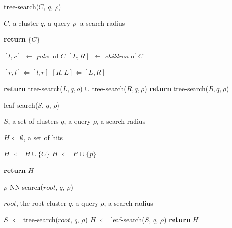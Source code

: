 \begin{algorithm} 
    \caption{tree-search($C$, $q$, $\rho$)} 
    \label{alg:methods:rnn-search:tree-search} 
    \begin{algorithmic}
        \REQUIRE $C$, a cluster
        \REQUIRE $q$, a query
        \REQUIRE $\rho$, a search radius

            \STATE \textbf{return} $\{C\}$
        \ELSE

            \STATE $[l, r]$ $\Leftarrow$ \emph{pole}s of $C$
            \STATE $[L, R]$ $\Leftarrow$ \emph{children} of $C$

                \STATE $[r, l] \Leftarrow [l, r]$
                \STATE $[R, L] \Leftarrow [L, R]$
            \ENDIF

                \STATE \textbf{return} tree-search($L, q, \rho$) $\cup$ tree-search($R, q, \rho$)
            \ELSE
                \STATE \textbf{return} tree-search($R, q, \rho$)
            \ENDIF
        \ENDIF
    \end{algorithmic}
\end{algorithm}

\begin{algorithm} 
    \caption{leaf-search($S$, $q$, $\rho$)} 
    \label{alg:methods:rnn-search:leaf-search} 
    \begin{algorithmic}
        \REQUIRE $S$, a set of clusters
        \REQUIRE $q$, a query
        \REQUIRE $\rho$, a search radius

        \STATE $H \Leftarrow \emptyset$, a set of hits

                \STATE $H$ $\Leftarrow$ $H \cup \{C\}$
            \ELSE
                        \STATE $H$ $\Leftarrow$ $H \cup \{p\}$
                    \ENDIF
                \ENDFOR
            \ENDIF
        \ENDFOR

        \STATE \textbf{return} $H$
    \end{algorithmic}
\end{algorithm}

\begin{algorithm} 
    \caption{$\rho$-NN-search($root$, $q$, $\rho$)} 
    \label{alg:methods:rnn-search} 
    \begin{algorithmic}
        \REQUIRE $root$, the root cluster
        \REQUIRE $q$, a query
        \REQUIRE $\rho$, a search radius

        \STATE $S$ $\Leftarrow$ tree-search($root$, $q$, $\rho$)
        \STATE $H$ $\Leftarrow$ leaf-search($S$, $q$, $\rho$)
        \STATE \textbf{return} $H$
    \end{algorithmic}
\end{algorithm}

